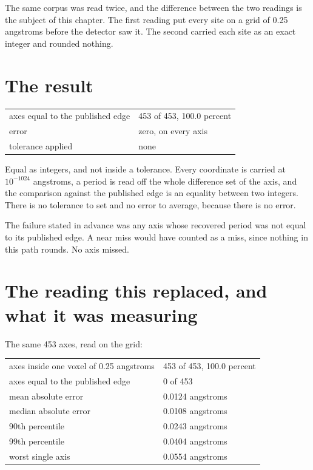 The same corpus was read twice, and the difference between the two readings is the subject of this chapter. The first reading put every site on a grid of 0.25 angstroms before the detector saw it. The second carried each site as an exact integer and rounded nothing.

\section{The result}

\begin{longtable}{@{}p{}p{}@{}}
\toprule
\endhead
axes equal to the published edge & 453 of 453, 100.0 percent \\
error & zero, on every axis \\
tolerance applied & none \\
\bottomrule
\end{longtable}

Equal as integers, and not inside a tolerance. Every coordinate is carried at $10^{-1024}$ angstroms, a period is read off the whole difference set of the axis, and the comparison against the published edge is an equality between two integers. There is no tolerance to set and no error to average, because there is no error.

The failure stated in advance was any axis whose recovered period was not equal to its published edge. A near miss would have counted as a miss, since nothing in this path rounds. No axis missed.

\section{The reading this replaced, and what it was measuring}

The same 453 axes, read on the grid:

\begin{longtable}{@{}p{}p{}@{}}
\toprule
\endhead
axes inside one voxel of 0.25 angstroms & 453 of 453, 100.0 percent \\
axes equal to the published edge & 0 of 453 \\
mean absolute error & 0.0124 angstroms \\
median absolute error & 0.0108 angstroms \\
90th percentile & 0.0243 angstroms \\
99th percentile & 0.0404 angstroms \\
worst single axis & 0.0554 angstroms \\
\bottomrule
\end{longtable}

